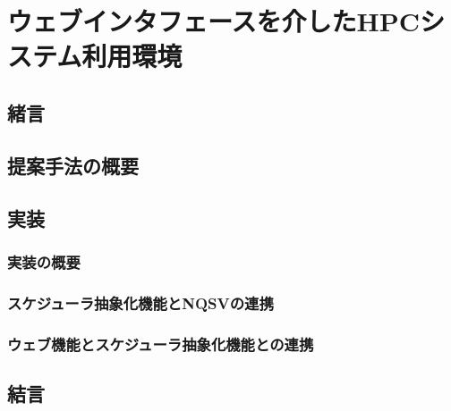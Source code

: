 
\section{ウェブインタフェースを介したHPCシステム利用環境}

\subsection{緒言}

\subsection{提案手法の概要}

\subsection{実装}
\subsubsection{実装の概要}

\subsubsection{スケジューラ抽象化機能とNQSVの連携}

\subsubsection{ウェブ機能とスケジューラ抽象化機能との連携}

\subsection{結言}